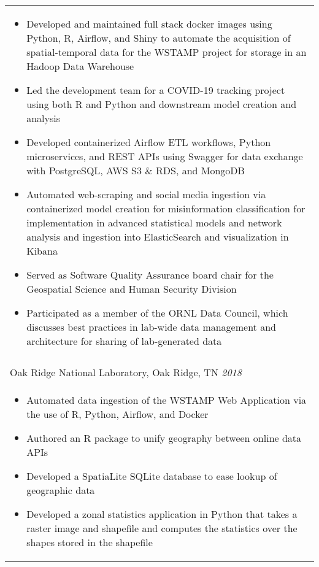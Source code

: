\documentclass[10pt]{article}%
\begin{document}
\begin{tabularx}{\linewidth}{M}
\begin{itemize}[topsep=-12pt,parsep=0em]
          \item Developed and maintained full stack docker images using Python, R, Airflow, and Shiny to automate the acquisition of spatial-temporal data for the WSTAMP project for storage in an Hadoop Data Warehouse %
          \item Led the development team for a COVID-19 tracking project using both R and Python and downstream model creation and analysis %
          \item Developed containerized Airflow ETL workflows, Python microservices, and REST APIs using Swagger for data exchange with PostgreSQL, AWS S3 \& RDS, and MongoDB %
          \item Automated web-scraping and social media ingestion via containerized model creation for misinformation classification for implementation in advanced statistical models and network analysis and ingestion into ElasticSearch and visualization in Kibana %
          \item Served as Software Quality Assurance board chair for the Geospatial Science and Human Security Division %
          \item Participated as a member of the ORNL Data Council, which discusses best practices in lab-wide data management and architecture for sharing of lab-generated data %
      \end{itemize} \\
            \\
      Oak Ridge National Laboratory, Oak Ridge, TN \textit{2018 } \\
      \begin{itemize}[topsep=-12pt,parsep=0em]
          \setlength\itemsep{0em}
          \item Automated data ingestion of the WSTAMP Web Application via the use of R, Python, Airflow, and Docker %
          \item Authored an R package to unify geography between online data APIs %
          \item Developed a SpatiaLite SQLite database to ease lookup of geographic data %
          \item Developed a zonal statistics application in Python that takes a raster image and shapefile and computes the statistics over the shapes stored in the shapefile %
        \end{itemize} \\
   \end{tabularx}
   \newpage
\end{document}
